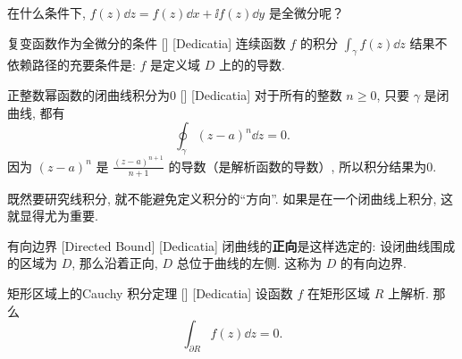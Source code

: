 \documentclass[UTF8]{ctexart}
\begin{document}
        在什么条件下,  \(f(z)\dd{z}=f(z)\dd{x}+\ii f(z)\dd{y}\) 是全微分呢？

        \begin{crl}
            [UUID]
            {复变函数作为全微分的条件}
            []
            [Dedicatia]
            连续函数 \(f\) 的积分 \(\int_\gamma f(z)\dd{z}\) 结果不依赖路径的充要条件是:  \(f\) 是定义域 \(D\) 上的 的导数. 
        \end{crl}

        \begin{xmp}
            [UUID]
            {正整数幂函数的闭曲线积分为0}
            []
            [Dedicatia]
            对于所有的整数 \(n\geqslant 0\), 只要 \(\gamma\) 是闭曲线, 都有
            \[\oint_\gamma (z-a)^n\dd{z}=0.\]
            因为 \((z-a)^n\) 是 \(\frac{(z-a)^{n+1}}{n+1}\) 的导数（是解析函数的导数）, 所以积分结果为0. 
        \end{xmp}

        既然要研究线积分, 就不能避免定义积分的“方向”. 如果是在一个闭曲线上积分, 这就显得尤为重要. 

        \begin{dfn}
            [UUID]
            {有向边界}
            [Directed Bound]
            [Dedicatia]
            闭曲线的\textbf{正向}是这样选定的: 设闭曲线围成的区域为 \(D\), 那么沿着正向,  \(D\) 总位于曲线的左侧. 这称为 \(D\) 的有向边界. 
        \end{dfn}

        \begin{thm}
            [UUID]
            {矩形区域上的Cauchy 积分定理}
            []
            [Dedicatia]
            设函数 \(f\) 在矩形区域 \(R\) 上解析. 那么
            \[\int_{\partial R}f(z)\dd{z}=0.\]
        \end{thm}
\end{document}
